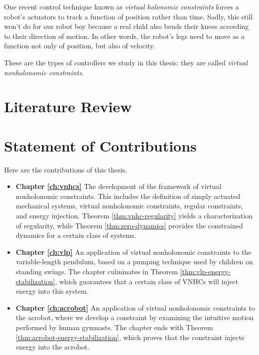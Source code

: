 One recent control technique known as \textit{virtual holonomic constraints}
forces a robot's actuators to track a function of position rather than time.
Sadly, this still won't do for our robot boy because a real child also bends
their knees according to their direction of motion.
In other words, the robot's legs need to move as a function not only of
position, but also of velocity.

These are the types of controllers we study in this thesis: they are called
\textit{virtual nonholonomic constraints}.

\section{Literature Review}


\section{Statement of Contributions}
Here are the contributions of this thesis.
\begin{itemize}[label={}]
   \item \textbf{Chapter \ref{ch:vnhcs}} The development of the framework of
      virtual nonholonomic constraints.
      This includes the definition of simply actuated mechanical systems, virtual
      nonholonomic constraints, regular constraints, and energy injection.
      Theorem \ref{thm:vnhc-regularity} yields a characterization of regularity, 
      while Theorem \ref{thm:zero-dynamics} provides the constrained dynamics
      for a certain class of systems.
   \item \textbf{Chapter \ref{ch:vlp}} An application of virtual nonholonomic
      constraints to the variable-length pendulum, based on a pumping technique
      used by children on standing swings.
      The chapter culminates in Theorem \ref{thm:vlp-energy-stabilization},
      which guarantees that a certain class of VNHCs will inject energy into
      this system.
   \item \textbf{Chapter \ref{ch:acrobot}} An application of virtual
      nonholonomic constraints to the acrobot, where we develop a constraint
      by examining the intuitive motion performed by human gymnasts.
      The chapter ends with Theorem \ref{thm:acrobot-energy-stabilization},
      which proves that the constraint injects energy into the acrobot.
\end{itemize}

